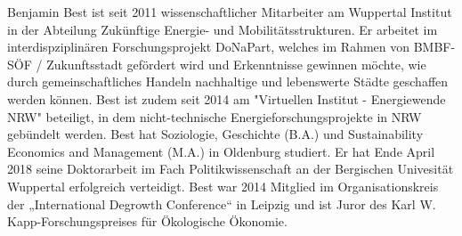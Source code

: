 \documentclass[a4paper,11pt,twoside]{scrartcl}
\begin{document}
Benjamin Best ist seit 2011 wissenschaftlicher Mitarbeiter am Wuppertal Institut in der Abteilung Zukünftige Energie- und Mobilitätsstrukturen. Er arbeitet im interdispziplinären Forschungsprojekt DoNaPart, welches im Rahmen von BMBF-SÖF / Zukunftsstadt gefördert wird und Erkenntnisse gewinnen möchte, wie durch gemeinschaftliches Handeln nachhaltige und lebenswerte Städte geschaffen werden können. Best ist zudem seit 2014 am "Virtuellen Institut - Energiewende NRW" beteiligt, in dem nicht-technische Energieforschungsprojekte in NRW gebündelt werden. 
Best hat Soziologie, Geschichte (B.A.) und Sustainability Economics and Management (M.A.) in Oldenburg studiert. Er hat Ende April 2018 seine Doktorarbeit im Fach Politikwissenschaft an der Bergischen Univesität Wuppertal erfolgreich verteidigt. Best war 2014 Mitglied im Organisationskreis der „International Degrowth Conference“ in Leipzig und ist Juror des Karl W. Kapp-Forschungspreises für Ökologische Ökonomie. 





\fi
\end{document}
